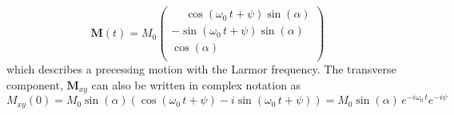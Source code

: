 \begin{equation}
	\textbf{M}(t) = M_0
	\begin{pmatrix}
		\phantom{-}\cos(\omega_{0}\, t+\psi) \sin(\alpha) \\
		-\sin(\omega_{0}\, t+\psi) \sin(\alpha)\\
		\cos(\alpha) \\
	\end{pmatrix}
\end{equation}
which describes a precessing motion with the Larmor frequency. The transverse component, $\textbf{M}_{xy}$  can also be written in complex notation as
\begin{equation}
    M_{xy}(0) = M_0\sin(\alpha)\left( \cos(\omega_{0}\, t + \psi) - i\sin(\omega_{0}\, t + \psi) \right) = M_0\sin(\alpha)\, e^{-i\omega_{0}\, t}e^{-i \psi}
\end{equation}

